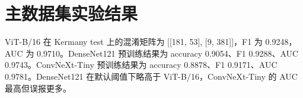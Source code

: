\chapter{主数据集实验结果}

ViT-B/16 在 Kermany test 上的混淆矩阵为 [[181, 53], [9, 381]]，F1 为 0.9248，AUC 为 0.9710。DenseNet121 预训练结果为 accuracy 0.9054、F1 0.9288、AUC 0.9743。ConvNeXt-Tiny 预训练结果为 accuracy 0.8878、F1 0.9171、AUC 0.9781。DenseNet121 在默认阈值下略高于 ViT-B/16，ConvNeXt-Tiny 的 AUC 最高但误报更多。
